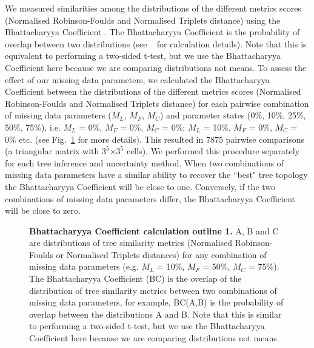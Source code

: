 \documentclass[10pt,letterpaper]{article}
\begin{document}
We measured similarities among the distributions of the different metrics scores (Normalised Robinson-Foulds and Normalised Triplets distance) using the Bhattacharyya Coefficient \cite{Bhattacharyya}. The Bhattacharyya Coefficient is the probability of overlap between two distributions \cite{Bhattacharyya} (see ~ for calculation details). Note that this is equivalent to performing a two-sided t-test, but we use the Bhattacharyya Coefficient here because we are comparing distributions not means. To assess the effect of our missing data parameters, we calculated the Bhattacharyya Coefficient between the distributions of the different metrics scores (Normalised Robinson-Foulds and Normalised Triplets distance) for each pairwise combination of missing data parameters ($M_{L}$, $M_{F}$, $M_{C}$) and parameter states (0\%, 10\%, 25\%, 50\%, 75\%), i.e. $M_{L}$ = 0\%, $M_{F}$ = 0\%, $M_{C}$ = 0\%; $M_{L}$ = 10\%, $M_{F}$ = 0\%, $M_{C}$ = 0\% etc. (see Fig.~\ref{Fig_Bhattacharyya_Coefficients1} for more details). This resulted in 7875 pairwise comparisons (a triangular matrix with $3^5$$\times$$3^5$ cells). We performed this procedure separately for each tree inference and uncertainty method. When two combinations of missing data parameters have a similar ability to recover the ``best" tree topology the Bhattacharyya Coefficient will be close to one. Conversely, if the two combinations of missing data parameters differ, the Bhattacharyya Coefficient will be close to zero.

\begin{figure}[h]
\caption{{\bf Bhattacharyya Coefficient calculation outline 1.}
 A, B and C are distributions of tree similarity metrics (Normalised Robinson-Foulds or Normalised Triplets distances) for any combination of missing data parameters (e.g. $M_{L}$ = 10\%, $M_{F}$ = 50\%, $M_{C}$ = 75\%). The Bhattacharyya Coefficient (BC) is the overlap of the distribution of tree similarity metrics between two combinations of missing data parameters, for example, BC(A,B) is the probability of overlap between the distributions A and B. Note that this is similar to performing a two-sided t-test, but we use the Bhattacharyya Coefficient here because we are comparing distributions not means.}
\label{Fig_Bhattacharyya_Coefficients1}
\end{figure}
\end{document}

